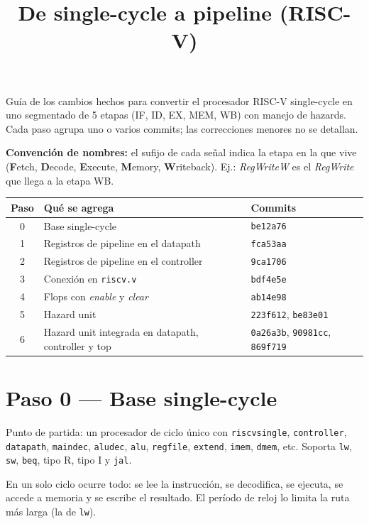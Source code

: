 \documentclass[11pt,a4paper]{article}
\title{\sffamily\bfseries\color{hhblue} De single-cycle a pipeline (RISC-V)}
\author{}
\date{}
\newcommand{\sig}[1]{\textit{#1}}
\newcommand{\ins}[1]{\texttt{#1}}
\begin{document}
\maketitle

Guía de los cambios hechos para convertir el procesador RISC-V single-cycle en uno segmentado de 5 etapas (IF, ID, EX, MEM, WB) con manejo de hazards. Cada paso agrupa uno o varios commits; las correcciones menores no se detallan.

\textbf{Convención de nombres:} el sufijo de cada señal indica la etapa en la que vive (\textbf{F}etch, \textbf{D}ecode, \textbf{E}xecute, \textbf{M}emory, \textbf{W}riteback). Ej.: \sig{RegWriteW} es el \sig{RegWrite} que llega a la etapa WB.

\begin{center}
\begin{tabular}{@{}cll@{}}
\toprule
Paso & Qué se agrega & Commits \\
\midrule
0 & Base single-cycle & \ins{be12a76} \\
1 & Registros de pipeline en el datapath & \ins{fca53aa} \\
2 & Registros de pipeline en el controller & \ins{9ca1706} \\
3 & Conexión en \ins{riscv.v} & \ins{bdf4e5e} \\
4 & Flops con \sig{enable} y \sig{clear} & \ins{ab14e98} \\
5 & Hazard unit & \ins{223f612}, \ins{be83e01} \\
6 & Hazard unit integrada en datapath, controller y top & \ins{0a26a3b}, \ins{90981cc}, \ins{869f719} \\
\bottomrule
\end{tabular}
\end{center}

\section{Paso 0 --- Base single-cycle}

Punto de partida: un procesador de ciclo único con \ins{riscvsingle}, \ins{controller}, \ins{datapath}, \ins{maindec}, \ins{aludec}, \ins{alu}, \ins{regfile}, \ins{extend}, \ins{imem}, \ins{dmem}, etc. Soporta \ins{lw}, \ins{sw}, \ins{beq}, tipo R, tipo I y \ins{jal}.

En un solo ciclo ocurre todo: se lee la instrucción, se decodifica, se ejecuta, se accede a memoria y se escribe el resultado. El período de reloj lo limita la ruta más larga (la de \ins{lw}).
\end{document}
